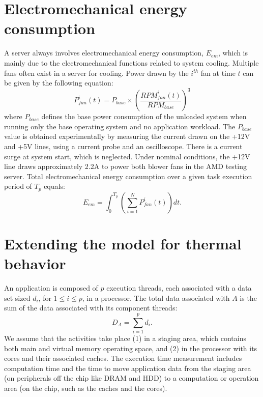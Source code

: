 \section{Electromechanical energy consumption}
\label{sec:electrical}
A server always involves electromechanical energy consumption, $E_{em}$,
which is mainly due to the electromechanical functions related to system
cooling.  Multiple fans often exist in a server for cooling.  Power
drawn by the $i^{th}$ fan at time $t$ can be given by the following
equation:
\begin{equation}
\label{eq:fanp}
P_{fan}^{i}(t) = P_{base} \times \left(\frac{RPM_{fan}^{i}(t)}{RPM_{base}}\right)^3
\end{equation} 
where $P_{base}$ defines the base power consumption of the unloaded system
when running only the base operating system and no application workload.
The $P_{base}$ value is obtained experimentally by measuring the current drawn
on the +12V and +5V lines, using a current probe and an oscilloscope.
There is a current surge at system start, which is neglected.
Under nominal conditions, the +12V line draws approximately 2.2A
to power both blower fans in the AMD testing server. Total electromechanical energy consumption over a given task execution
period of $T_{p}$ equals:
\begin{equation*}
\label{eq:elect}
E_{em} =  \int^{T_{p}}_0 \left(\sum_{i=1}^NP_{fan}^{i}(t)\right)dt.
\end{equation*} 

\section{Extending the model for thermal behavior}
\label{sec:extend-model-therm}
An application is composed of $p$ execution threads, each associated with a
data set sized $d_{i}$, for $1\leq i \leq p$, in a processor. The total
data associated with $A$ is the sum of the data associated with its
component threads:
\begin{equation}
\label{eq:totaldata} D_{A}=\displaystyle\sum_{i=1}^{p}{d_i}.
\end{equation} 
We assume that the activities take place (1) in a staging area,
which contains both main and virtual memory operating space,
and (2) in the processor with its cores and their associated caches.
The execution time measurement includes 
computation time and the time to move application data from the
staging area (on peripherals off the chip like DRAM and HDD) to a
computation or operation area (on the chip, such as the caches and the cores).

